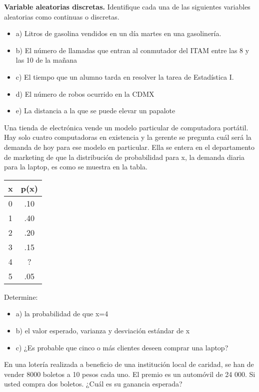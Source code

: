 \documentclass{../oxmathproblems}
\begin{document}
\begin{questions}


\miquestion \textbf {Variable aleatorias discretas.}
Identifique cada una de las siguientes variables aleatorias como continuas o discretas. 
\begin{itemize}
\item  a) Litros de gasolina vendidos en un día martes en una gasolinería. 
\item  b) El número de llamadas que entran al conmutador del ITAM entre las 8 y las 10 de la mañana
\item  c) El tiempo que un alumno tarda en resolver la tarea de Estadística I. 
\item  d) El número de robos ocurrido en la CDMX 
\item  e) La distancia a la que se puede elevar un papalote
\end{itemize}

\miquestion Una tienda de electrónica vende un modelo particular de computadora portátil. Hay solo cuatro computadoras en existencia y la gerente se pregunta cuál será la demanda de hoy para ese modelo en particular. Ella se entera en el departamento de marketing de que la distribución de probabilidad para x, la demanda diaria para la laptop, es como se muestra en la tabla.  

\begin{center}
\begin{tabular}{ |c|c| } 
 \hline
 \textbf{x} & \textbf{p(x)} \\ 
 \hline
 0 & .10 \\
 1  & .40 \\
2 & .20\\ 
 3 & .15 \\ 
4 & ? \\ 
5 & .05 \\ 
 \hline
\end{tabular}
\end{center}
 Determine:   
\begin{itemize}
\item  a) la probabilidad de que x=4
\item  b) el valor esperado, varianza y desviación estándar de x
\item  c) ¿Es probable que cinco o más clientes deseen comprar una laptop?
\end{itemize}


\miquestion En una lotería realizada a beneficio de una institución local de caridad, se han de vender 8000 boletos a 10 pesos cada uno. El premio es un automóvil de 24 000. Si usted compra dos boletos. ¿Cuál es su ganancia esperada?


\end{questions}
\end{document}
